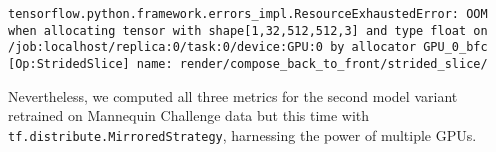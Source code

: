 \begin{lstlisting}[breaklines]
    tensorflow.python.framework.errors_impl.ResourceExhaustedError: OOM when allocating tensor with shape[1,32,512,512,3] and type float on /job:localhost/replica:0/task:0/device:GPU:0 by allocator GPU_0_bfc [Op:StridedSlice] name: render/compose_back_to_front/strided_slice/
\end{lstlisting}

Nevertheless, we computed all three metrics for the second model variant retrained on Mannequin Challenge data but this time with \verb`tf.distribute.MirroredStrategy`, harnessing the power of multiple GPUs.


